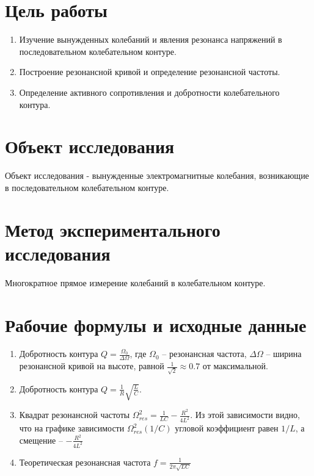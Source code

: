 \section{Цель работы}
\begin{enumerate}
	\item Изучение вынужденных колебаний и явления резонанса напряжений в последовательном колебательном контуре.
	\item Построение резонансной кривой и определение резонансной частоты.
	\item Определение активного сопротивления и добротности колебательного контура.
\end{enumerate}

\section{Объект исследования}
Объект исследования - вынужденные электромагнитные колебания,
возникающие в последовательном колебательном контуре.
\section{Метод экспериментального исследования}
Многократное прямое измерение колебаний в колебательном контуре.

\section{Рабочие формулы и исходные данные}
\begin{enumerate}
	\item Добротность контура \(Q = \frac{\Omega_0}{\Delta \Omega}\),
	      где \(\Omega_0\) -- резонансная частота, \(\Delta \Omega\) -- ширина резонансной
	      кривой на высоте, равной $\frac{1}{\sqrt{2}} \approx 0.7 $ от максимальной.
	\item Добротность контура \(Q = \frac{1}{R} \sqrt{\frac{L}{C}}\).
	\item Квадрат резонансной частоты \(\Omega_{res}^2 = \frac{1}{LC} - \frac{R^2}{4 L^2}\).
	      Из этой зависимости видно, что на графике зависимости \(\Omega_{res}^2(1/C)\)
	      угловой коэффициент равен \(1/L\), а смещение -- \(- \frac{R^2}{4 L^2}\)
	\item Теоретическая резонансная частота \(f = \frac{1}{2 \pi \sqrt{L C}}\)
\end{enumerate}

